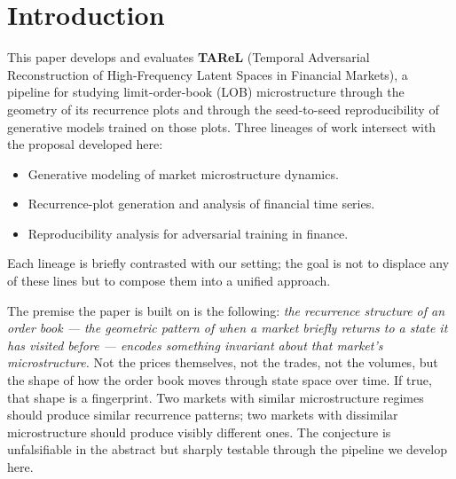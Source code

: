 \section{Introduction}

This paper develops and evaluates \textbf{TAReL} (Temporal Adversarial
Reconstruction of High-Frequency Latent Spaces in Financial Markets), a
pipeline for studying limit-order-book (LOB) microstructure through the
geometry of its recurrence plots and through the seed-to-seed
reproducibility of generative models trained on those plots. Three
lineages of work intersect with the proposal developed here:
\begin{itemize}\setlength{\itemsep}{1pt}
\item Generative modeling of market microstructure dynamics.
\item Recurrence-plot generation and analysis of financial time series.
\item Reproducibility analysis for adversarial training in finance.
\end{itemize}
Each lineage is briefly contrasted with our setting; the goal is not
to displace any of these lines but to compose them into a unified
approach.

The premise the paper is built on is the following: \emph{the
recurrence structure of an order book --- the geometric pattern of
when a market briefly returns to a state it has visited before ---
encodes something invariant about that market's microstructure.} Not
the prices themselves, not the trades, not the volumes, but the shape
of how the order book moves through state space over time. If true,
that shape is a fingerprint. Two markets with similar microstructure
regimes should produce similar recurrence patterns; two markets with
dissimilar microstructure should produce visibly different ones. The
conjecture is unfalsifiable in the abstract but sharply testable
through the pipeline we develop here.
